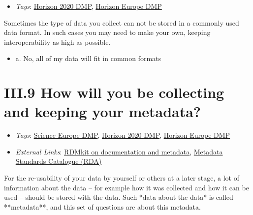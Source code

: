 \documentclass[a4paper,12pt]{report}
\begin{document}
\label{b1df3c74-0b1f-4574-81c4-4cc2d780c1af.5ba53879-eb48-47f2-a73b-f7f7d83bf030}


\begin{itemize}
  \item \textit{Tags}: \ul{Horizon 2020 DMP}, \ul{Horizon Europe DMP}
  \end{itemize}


\noindent
\begin{markdown}
Sometimes the type of data you collect can not be stored in a commonly used data format. In such cases you may need to make your own, keeping interoperability as high as possible.
\end{markdown}



\begin{itemize}
  \item[\CheckmarkBold] a. No, all of my data will fit in common formats
\end{itemize}






\section*{\protect\textcolor{colorSecId}{III.9} How will you be collecting and keeping your metadata?}

\label{b1df3c74-0b1f-4574-81c4-4cc2d780c1af.8c962e6f-17ee-4b22-8ebb-9f06f779e3b3}


\begin{itemize}
  \item \textit{Tags}: \ul{Science Europe DMP}, \ul{Horizon 2020 DMP}, \ul{Horizon Europe DMP}
  
  \item \textit{External Links}: \href{https://rdmkit.elixir-europe.org/metadata_management.html}{RDMkit on documentation and metadata}, \href{https://rdamsc.bath.ac.uk/}{Metadata Standards Catalogue (RDA)}\end{itemize}


\noindent
\begin{markdown}
For the re-usability of your data by yourself or others at a later stage, a lot of information about the data – for example how it was collected and how it can be used – should be stored with the data. Such *data about the data* is called **metadata**, and this set of questions are about this metadata.
\end{markdown}
\end{document}
